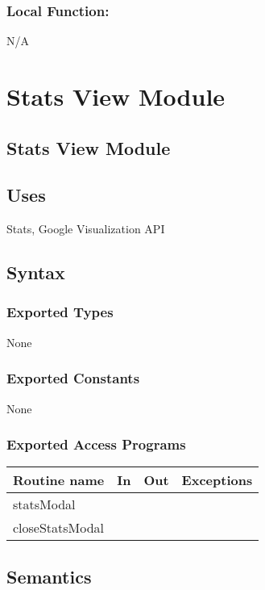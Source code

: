 \documentclass[12pt]{article}
\begin{document}
\subsubsection*{Local Function:}

N/A

\newpage

\section {Stats View Module}

\subsection* {Stats View Module}

\subsection* {Uses}

Stats, Google Visualization API

\subsection* {Syntax}

\subsubsection* {Exported Types}

None

\subsubsection* {Exported Constants}

None

\subsubsection* {Exported Access Programs}

\begin{tabular}{| l | l | l | p{6cm} |}
\hline
\textbf{Routine name} & \textbf{In} & \textbf{Out} & \textbf{Exceptions}\\
\hline
statsModal & ~ & ~ &  \\
\hline
closeStatsModal & ~ & ~ & \\
\hline
\end{tabular}

\subsection* {Semantics}
\end{document}
